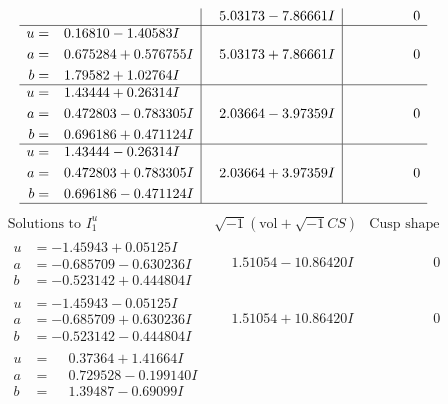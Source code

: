 \documentclass[1p]{elsarticle_modified}
\theoremstyle{definition}
\newcommand{\I}{\sqrt{-1}}
\begin{document}
$$\begin{array}{c|c|c}
 & \phantom{-}5.03173 - 7.86661 I & \phantom{-0.000000 } 0 \\ \hline\begin{aligned}
u &= \phantom{-}0.16810 - 1.40583 I \\
a &= \phantom{-}0.675284 + 0.576755 I \\
b &= \phantom{-}1.79582 + 1.02764 I\end{aligned}
 & \phantom{-}5.03173 + 7.86661 I & \phantom{-0.000000 } 0 \\ \hline\begin{aligned}
u &= \phantom{-}1.43444 + 0.26314 I \\
a &= \phantom{-}0.472803 - 0.783305 I \\
b &= \phantom{-}0.696186 + 0.471124 I\end{aligned}
 & \phantom{-}2.03664 - 3.97359 I & \phantom{-0.000000 } 0 \\ \hline\begin{aligned}
u &= \phantom{-}1.43444 - 0.26314 I \\
a &= \phantom{-}0.472803 + 0.783305 I \\
b &= \phantom{-}0.696186 - 0.471124 I\end{aligned}
 & \phantom{-}2.03664 + 3.97359 I & \phantom{-0.000000 } 0\\
 \hline 
 \end{array}$$\newpage$$\begin{array}{c|c|c}  
\text{Solutions to }I^u_{1}& \I (\text{vol} + \sqrt{-1}CS) & \text{Cusp shape}\\
 \hline 
\begin{aligned}
u &= -1.45943 + 0.05125 I \\
a &= -0.685709 - 0.630236 I \\
b &= -0.523142 + 0.444804 I\end{aligned}
 & \phantom{-}1.51054 - 10.86420 I & \phantom{-0.000000 } 0 \\ \hline\begin{aligned}
u &= -1.45943 - 0.05125 I \\
a &= -0.685709 + 0.630236 I \\
b &= -0.523142 - 0.444804 I\end{aligned}
 & \phantom{-}1.51054 + 10.86420 I & \phantom{-0.000000 } 0 \\ \hline\begin{aligned}
u &= \phantom{-}0.37364 + 1.41664 I \\
a &= \phantom{-}0.729528 - 0.199140 I \\
b &= \phantom{-}1.39487 - 0.69099 I\end{aligned}

\end{array}$$
\end{document}
